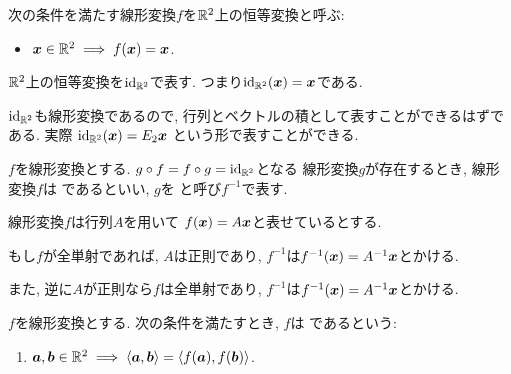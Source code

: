 \begin{definition}
  次の条件を満たす線形変換$f$を$\mathbb{R}^2$上の恒等変換と呼ぶ:
  \begin{itemize}
  \item  $\boldsymbol{x}\in\mathbb{R}^2\implies f(\boldsymbol{x})=\boldsymbol{x}$.
  \end{itemize}
  $\mathbb{R}^2$上の恒等変換を$\operatorname{id}_{\mathbb{R}^2}$で表す.
  つまり$\operatorname{id}_{\mathbb{R}^2}(\boldsymbol{x})=\boldsymbol{x}$である.
\end{definition}
\begin{remark}
  $\operatorname{id}_{\mathbb{R}^2}$も線形変換であるので, 行列とベクトルの積として表すことができるはずである.
  実際
  $\operatorname{id}_{\mathbb{R}^2}(\boldsymbol{x})=E_2\boldsymbol{x}$
  という形で表すことができる.
\end{remark}
\begin{definition}
  $f$を線形変換とする.
  $g\circ f=f\circ g=\operatorname{id}_{\mathbb{R}^2}$となる
  線形変換$g$が存在するとき,
  線形変換$f$は
  であるといい,
  $g$を
  と呼び$f^{-1}$で表す.
\end{definition}
\begin{remark}
  線形変換$f$は行列$A$を用いて
  $f(\boldsymbol{x})=A\boldsymbol{x}$と表せているとする.
   
  もし$f$が全単射であれば,
  $A$は正則であり,
  $f^{-1}$は$f^{-1}(\boldsymbol{x})=A^{-1}\boldsymbol{x}$とかける.

  また, 逆に$A$が正則なら$f$は全単射であり,
  $f^{-1}$は$f^{-1}(\boldsymbol{x})=A^{-1}\boldsymbol{x}$とかける.
\end{remark}

\begin{definition}
  $f$を線形変換とする.
  次の条件を満たすとき,
  $f$は
  であるという:
  \begin{enumerate}
    \item $\boldsymbol{a},\boldsymbol{b}\in\mathbb{R}^2\implies \Braket{\boldsymbol{a},\boldsymbol{b}}=\Braket{f(\boldsymbol{a}),f(\boldsymbol{b})}$.
  \end{enumerate}
\end{definition}

